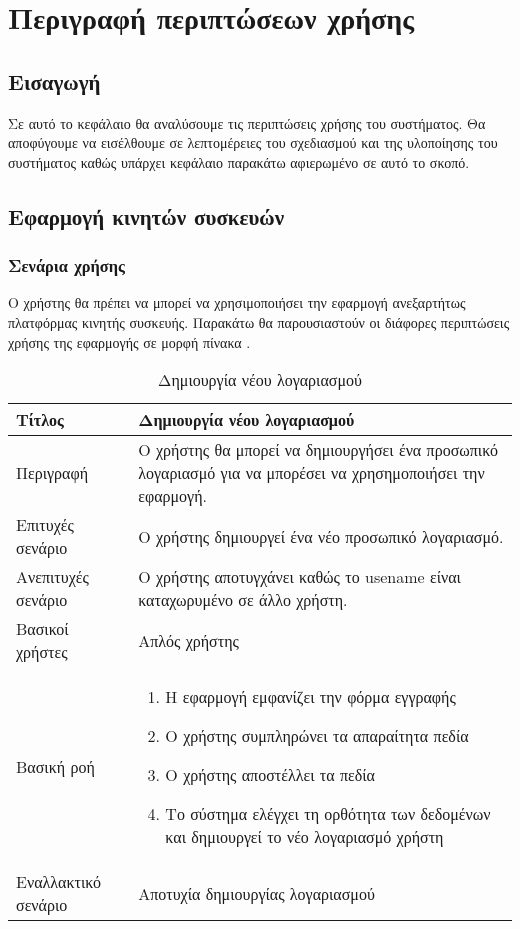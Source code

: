 \chapter{Περιγραφή περιπτώσεων χρήσης}

\section{Εισαγωγή}
Σε αυτό το κεφάλαιο θα αναλύσουμε τις περιπτώσεις χρήσης του συστήματος. Θα αποφύγουμε να εισέλθουμε σε λεπτομέρειες του σχεδιασμού και της υλοποίησης του συστήματος καθώς υπάρχει κεφάλαιο παρακάτω αφιερωμένο σε αυτό το σκοπό.

\section{Εφαρμογή κινητών συσκευών}

\subsection{Σενάρια χρήσης}
Ο χρήστης θα πρέπει να μπορεί να χρησιμοποιήσει την εφαρμογή ανεξαρτήτως πλατφόρμας κινητής συσκευής. Παρακάτω θα παρουσιαστούν οι διάφορες περιπτώσεις χρήσης της εφαρμογής σε μορφή πίνακα \citep{uml}.


\begin{table}[h]
 \caption{Δημιουργία νέου λογαριασμού}
\begin{center}
\begin{tabular}{ | m{10em} |  m{25em} | } 
\hline
 Τίτλος & Δημιουργία νέου λογαριασμού \\ 
\hline
 Περιγραφή & Ο χρήστης θα μπορεί να δημιουργήσει ένα προσωπικό λογαριασμό για να μπορέσει να χρησημοποιήσει την εφαρμογή. \\ 
\hline
 Επιτυχές σενάριο &  Ο χρήστης δημιουργεί ένα νέο προσωπικό λογαριασμό.\\
\hline
 Ανεπιτυχές σενάριο  & Ο χρήστης αποτυγχάνει καθώς το usename είναι καταχωρυμένο σε άλλο χρήστη. \\ 
\hline
 Βασικοί χρήστες  & Απλός χρήστης \\ 
\hline
 Βασική ροή  & 
\begin{enumerate}
\item Η εφαρμογή εμφανίζει την φόρμα εγγραφής
\item Ο χρήστης συμπληρώνει τα απαραίτητα πεδία
\item Ο χρήστης αποστέλλει τα πεδία
\item Το σύστημα ελέγχει τη ορθότητα των δεδομένων και δημιουργεί το νέο λογαριασμό χρήστη
\end{enumerate}
 \\ 
\hline
 Εναλλακτικό σενάριο  & Αποτυχία δημιουργίας λογαριασμού  \\ 
\hline
\end{tabular}
\end{center}
\end{table}

